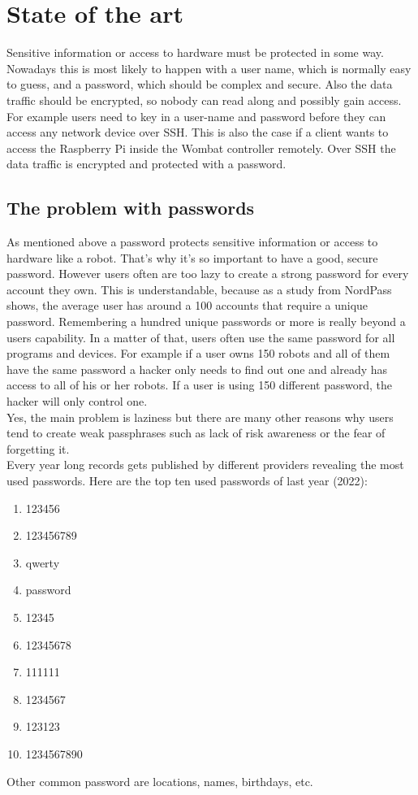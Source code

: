\documentclass[conference]{IEEEtran}
\begin{document}
\section{State of the art}
Sensitive information or access to hardware must be protected in some way. Nowadays this is most likely to happen with a user name, which is normally easy to guess, and a password, which should be complex and secure. Also the data traffic should be encrypted, so nobody can read along and possibly gain access.\\
For example users need to key in a user-name and password before they can access any network device over SSH. This is also the case if a client wants to access the Raspberry Pi inside the Wombat controller remotely. Over SSH the data traffic is encrypted and protected with a password.


\subsection{The problem with passwords} 
As mentioned above a password protects sensitive information or access to hardware like a robot. That's why it's so important to have a good, secure password. However users often are too lazy to create a strong password for every account they own. This is understandable, because as a study from NordPass shows, the average user has around a 100 accounts that require a unique password. Remembering a hundred unique passwords or more is really beyond a users capability. In a matter of that, users often use the same password for all programs and devices. For example if a user owns 150 robots and all of them have the same password a hacker only needs to find out one and already has access to all of his or her robots. If a user is using 150 different password, the hacker will only control one.\cite{b1} \cite{b2}\\
Yes, the main problem is laziness but there are many other reasons why users tend to create weak passphrases such as lack of risk awareness or the fear of forgetting it.\\
Every year long records gets published by different providers revealing the most used passwords. Here are the top ten used passwords of last year (2022): \cite{b3}
\begin{enumerate}
\item 123456
\item 123456789
\item qwerty
\item password
\item 12345
\item 12345678
\item 111111
\item 1234567
\item 123123
\item 1234567890
\end{enumerate}
Other common password are locations, names, birthdays, etc.
\end{document}
